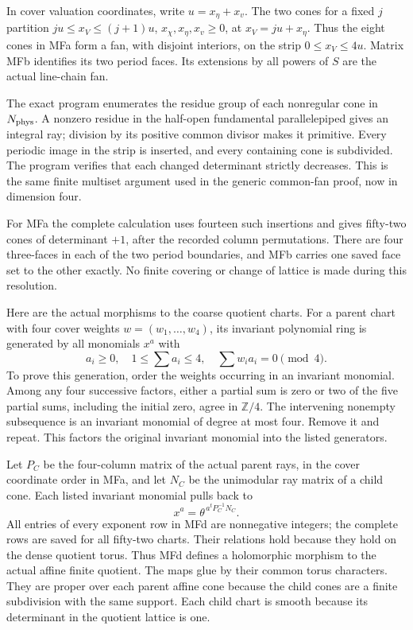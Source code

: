 In cover valuation coordinates, write \(u=x_\eta+x_v\). The two cones for a fixed \(j\) partition
\(ju\le x_V\le(j+1)u\), \(x_\chi,x_\eta,x_v\ge0\), at
\(x_V=ju+x_\eta\). Thus the eight cones in MFa form a fan, with disjoint interiors, on the strip \(0\le x_V\le4u\). Matrix MFb identifies its two period faces. Its extensions by all powers of \(S\) are the actual line-chain fan.

The exact program  enumerates the residue group of each nonregular cone in \(N_{\rm phys}\). A nonzero residue in the half-open fundamental parallelepiped gives an integral ray; division by its positive common divisor makes it primitive. Every periodic image in the strip is inserted, and every containing cone is subdivided. The program verifies that each changed determinant strictly decreases. This is the same finite multiset argument used in the generic common-fan proof, now in dimension four.

For MFa the complete calculation uses fourteen such insertions and gives fifty-two cones of determinant \(+1\), after the recorded column permutations. There are four three-faces in each of the two period boundaries, and MFb carries one saved face set to the other exactly. No finite covering or change of lattice is made during this resolution.

Here are the actual morphisms to the coarse quotient charts. For a parent chart with four cover weights \(w=(w_1,\ldots,w_4)\), its invariant polynomial ring is generated by all monomials \(x^a\) with
\[
 a_i\ge0,\quad1\le\sum a_i\le4,\quad\sum w_ia_i=0\pmod4.
\]
To prove this generation, order the weights occurring in an invariant monomial. Among any four successive factors, either a partial sum is zero or two of the five partial sums, including the initial zero, agree in \(\mathbb Z/4\). The intervening nonempty subsequence is an invariant monomial of degree at most four. Remove it and repeat. This factors the original invariant monomial into the listed generators.

Let \(P_C\) be the four-column matrix of the actual parent rays, in the cover coordinate order in MFa, and let \(N_C\) be the unimodular ray matrix of a child cone. Each listed invariant monomial pulls back to
\[
 x^a=\theta^{\,a^tP_C^{-1}N_C}.                              \tag{MFd}
\]
All entries of every exponent row in MFd are nonnegative integers; the complete rows are saved for all fifty-two charts. Their relations hold because they hold on the dense quotient torus. Thus MFd defines a holomorphic morphism to the actual affine finite quotient. The maps glue by their common torus characters. They are proper over each parent affine cone because the child cones are a finite subdivision with the same support. Each child chart is smooth because its determinant in the quotient lattice is one.

